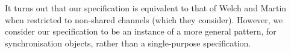 
It turns out that our specification is equivalent to that of Welch and
Martin~\cite{welch-martin} when restricted to non-shared channels (which they
consider).  However, we consider our specification to be an instance of a more
general pattern, for synchronisation objects, rather than a single-purpose
specification.
